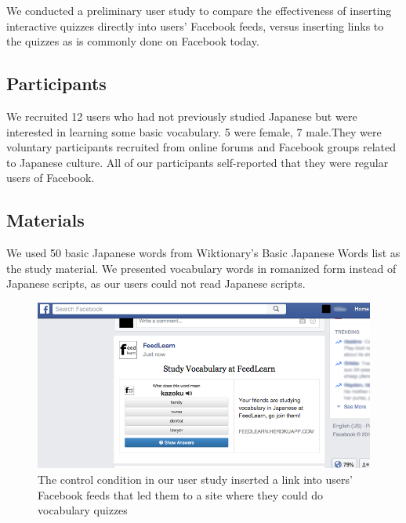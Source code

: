 \documentclass{chi-ext}
\begin{document}
We conducted a preliminary user study to compare the effectiveness of inserting interactive quizzes directly into users' Facebook feeds, versus inserting links to the quizzes as is commonly done on Facebook today. %

\subsection{Participants}

We recruited 12 users who had not previously studied Japanese but were interested in learning some basic vocabulary.  5 were female, 7 male.They were voluntary participants recruited from online forums and Facebook groups related to Japanese culture. All of our participants self-reported that they were regular users of Facebook. %



\subsection{Materials}

We used 50 basic Japanese words from Wiktionary's Basic Japanese Words list as the study material. We presented vocabulary words in romanized form instead of Japanese scripts, as our users could not read Japanese scripts.


\begin{figure}
\centering
\includegraphics[width=1.0\columnwidth]{feedlearn-link-screenshot}
\caption{The control condition in our user study inserted a link into users' Facebook feeds that led them to a site where they could do vocabulary quizzes}
\label{fig:control}
\end{figure}
\end{document}
